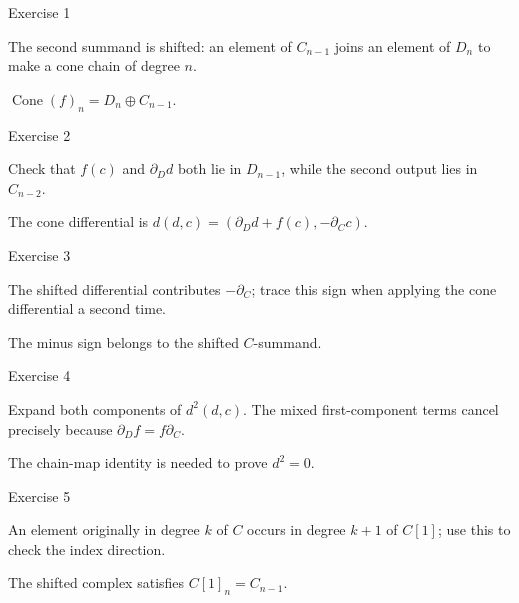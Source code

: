 \begin{exercise}\label{exr:viii24-01}
Exercise 1
\end{exercise}
\begin{hint}
The second summand is shifted: an element of \(C_{n-1}\) joins an element of \(D_n\) to make a cone chain of degree \(n\).
\end{hint}
\begin{solution}
\(\operatorname{Cone}(f)_n=D_n\oplus C_{n-1}\).
\end{solution}

\begin{exercise}\label{exr:viii24-02}
Exercise 2
\end{exercise}
\begin{hint}
Check that \(f(c)\) and \(\partial_D d\) both lie in \(D_{n-1}\), while the second output lies in \(C_{n-2}\).
\end{hint}
\begin{solution}
The cone differential is \(d(d,c)=(\partial_Dd+f(c),-\partial_Cc)\).
\end{solution}

\begin{exercise}\label{exr:viii24-03}
Exercise 3
\end{exercise}
\begin{hint}
The shifted differential contributes \(-\partial_C\); trace this sign when applying the cone differential a second time.
\end{hint}
\begin{solution}
The minus sign belongs to the shifted \(C\)-summand.
\end{solution}

\begin{exercise}\label{exr:viii24-04}
Exercise 4
\end{exercise}
\begin{hint}
Expand both components of \(d^2(d,c)\). The mixed first-component terms cancel precisely because \(\partial_D f=f\partial_C\).
\end{hint}
\begin{solution}
The chain-map identity is needed to prove \(d^2=0\).
\end{solution}

\begin{exercise}\label{exr:viii24-05}
Exercise 5
\end{exercise}
\begin{hint}
An element originally in degree \(k\) of \(C\) occurs in degree \(k+1\) of \(C[1]\); use this to check the index direction.
\end{hint}
\begin{solution}
The shifted complex satisfies \(C[1]_n=C_{n-1}\).
\end{solution}

